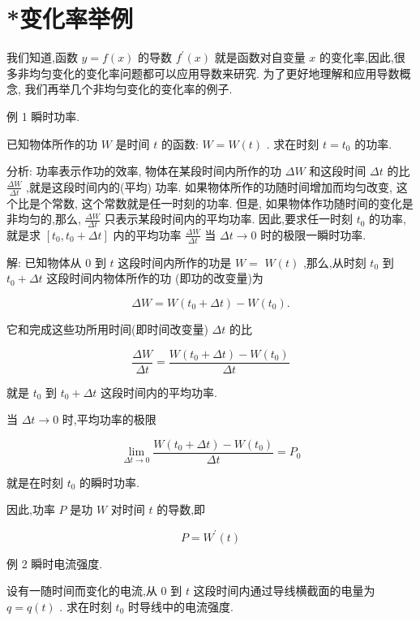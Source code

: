 \documentclass[lang=cn,newtx,10pt,scheme=chinese]{elegantbook}
\begin{document}
\section*{*变化率举例}

我们知道,函数 \(y = f\left( x\right)\) 的导数 \({f}^{\prime }\left( x\right)\) 就是函数对自变量 \(x\) 的变化率,因此,很多非均匀变化的变化率问题都可以应用导数来研究. 为了更好地理解和应用导数概念, 我们再举几个非均匀变化的变化率的例子.

例 1 瞬时功率.

已知物体所作的功 \(W\) 是时间 \(t\) 的函数: \(W = W\left( t\right)\) . 求在时刻 \(t = {t}_{0}\) 的功率.

分析: 功率表示作功的效率, 物体在某段时间内所作的功 \({\Delta W}\) 和这段时间 \({\Delta t}\) 的比 \(\frac{\Delta W}{\Delta t}\) ,就是这段时间内的(平均) 功率. 如果物体所作的功随时间增加而均匀改变, 这个比是个常数, 这个常数就是任一时刻的功率. 但是, 如果物体作功随时间的变化是非均匀的,那么, \(\frac{\Delta W}{\Delta t}\) 只表示某段时间内的平均功率. 因此,要求任一时刻 \({t}_{0}\) 的功率,就是求 \(\left\lbrack {{t}_{0},{t}_{0} + {\Delta t}}\right\rbrack\) 内的平均功率 \(\frac{\Delta W}{\Delta t}\) 当 \({\Delta t} \rightarrow 0\) 时的极限一瞬时功率.

解: 已知物体从 0 到 \(t\) 这段时间内所作的功是 \(W =\) \(W\left( t\right)\) ,那么,从时刻 \({t}_{0}\) 到 \({t}_{0} + {\Delta t}\) 这段时间内物体所作的功 (即功的改变量)为

\[
{\Delta W} = W\left( {{t}_{0} + {\Delta t}}\right) - W\left( {t}_{0}\right) .
\]

它和完成这些功所用时间(即时间改变量) \({\Delta t}\) 的比

\[
\frac{\Delta W}{\Delta t} = \frac{W\left( {{t}_{0} + {\Delta t}}\right) - W\left( {t}_{0}\right) }{\Delta t}
\]

就是 \({t}_{0}\) 到 \({t}_{0} + {\Delta t}\) 这段时间内的平均功率.

当 \({\Delta t} \rightarrow 0\) 时,平均功率的极限

\[
\mathop{\lim }\limits_{{{\Delta t} \rightarrow 0}}\frac{W\left( {{t}_{0} + {\Delta t}}\right) - W\left( {t}_{0}\right) }{\Delta t} = {P}_{0}
\]

就是在时刻 \({t}_{0}\) 的瞬时功率.

因此,功率 \(P\) 是功 \(W\) 对时间 \(t\) 的导数,即

\[
P = {W}^{\prime }\left( t\right)
\]

例 2 瞬时电流强度.

设有一随时间而变化的电流,从 0 到 \(t\) 这段时间内通过导线横截面的电量为 \(q = q\left( t\right)\) . 求在时刻 \({t}_{0}\) 时导线中的电流强度.
\end{document}
